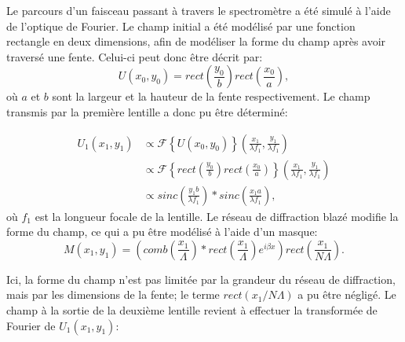 \documentclass[conference]{IEEEtran}
\begin{document}
Le parcours d'un faisceau passant à travers le spectromètre a été simulé à l'aide 
de l'optique de Fourier. Le champ initial a été modélisé par une fonction rectangle en deux dimensions,
afin de modéliser la forme du champ après avoir traversé une fente. Celui-ci peut donc être décrit par:
\[U(x_0,y_0)=rect(\frac{y_0}{b})rect(\frac{x_0}{a}),\]
où $a$ et $b$ sont la largeur et la hauteur de la fente respectivement. Le champ transmis par 
la première lentille a donc pu être déterminé:

\begin{align*}
    U_1(x_1,y_1)&\propto\mathscr{F}\left\{U(x_0,y_0)\right\}(\frac{x_1}{\lambda f_1},\frac{y_1}{\lambda f_1})\\
    &\propto \mathscr{F}\left\{rect(\frac{y_0}{b})rect(\frac{x_0}{a})\right\}(\frac{x_1}{\lambda f_1},\frac{y_1}{\lambda f_1})\\
    &\propto sinc(\frac{y_1b}{\lambda f_1})\ast sinc(\frac{x_1a}{\lambda f_1}),
\end{align*}
où $f_1$ est la longueur focale de la lentille. Le réseau de diffraction blazé modifie la forme du champ, ce qui a pu être
modélisé à l'aide d'un masque:
\[M(x_1,y_1)=(comb(\frac{x_1}{\Lambda})\ast rect(\frac{x_1}{\Lambda})e^{i\beta x})rect(\frac{x_1}{N\Lambda}).\]

Ici, la forme du champ n'est pas limitée par la grandeur du réseau de diffraction, mais par les dimensions
de la fente; le terme $rect(x_1/N\Lambda)$ a pu être négligé. Le champ à la sortie de la deuxième lentille revient à effectuer la transformée de Fourier
de $U_1(x_1,y_1)$:
\end{document}
